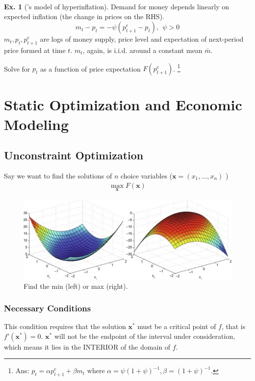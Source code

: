\documentclass[11pt,a4paper]{book}
\theoremstyle{definition}\newtheorem{definition}{Definition}
\theoremstyle{definition}\newtheorem{fact}{Fact}
\theoremstyle{definition}\newtheorem{remark}{Remark}
\theoremstyle{definition}\newtheorem{ex}{Ex.}
\theoremstyle{definition}\newtheorem{project}{Project}
\theoremstyle{definition}\newtheorem{problem}{Problem}
\theoremstyle{definition}\newtheorem{example}{Example}
\numberwithin{theorem}{section}
\numberwithin{corollary}{chapter}
\numberwithin{assumption}{chapter}
\numberwithin{definition}{chapter}
\numberwithin{prop}{chapter}
\numberwithin{notation}{chapter}
\numberwithin{problem}{chapter}
\numberwithin{example}{chapter}
\numberwithin{fact}{chapter}
\numberwithin{ex}{chapter}
\def\x{\mathbf x}
\begin{document}
	\begin{ex}[\citet{cagan1956monetary}'s model of hyperinflation]
		Demand for money depends linearly on expected inflation (the change in prices on the RHS).
		$$
			m_t - p_t = -\psi (p^e_{t+1} - p_t), \ \ \psi > 0
		$$
		$m_t, p_t, p^e_{t+1}$ are logs of money supply, price level and expectation of next-period price formed at time $t$. $m_t$, again, is i.i.d. around a constant mean $\bar{m}$. 
		
		Solve for $p_t$ as a function of price expectation $F(p^e_{t+1})$. \footnote{Ans: $p_t  = \alpha p^e_{t+1} + \beta m_t$ where $\alpha = \psi (1+\psi)^{-1}, \beta = (1+\psi)^{-1}$.}
	\end{ex}	
		
	\chapter{Static Optimization and Economic Modeling}
	\section{Unconstraint Optimization}
	Say we want to find the solutions of $n$ choice variables ($\x = (x_1, \dots, x_n)$ )
	\begin{align*}
		\max_{\x} F(\x) 
	\end{align*}
	
	\begin{figure}[ht]
		\centering
		\includegraphics[scale=1]{figs/maxmin.jpg}
		\caption{Find the min (left) or max (right).}
	\end{figure}
	
	\subsection{Necessary Conditions}
	This condition requires that the solution $\x^*$ must be a critical point of $f$, that is $f'(\x^*)=0$. $\x^*$ will not be the endpoint of the interval under consideration, which means it lies in the INTERIOR of the domain of $f$. 
	
\end{document}
